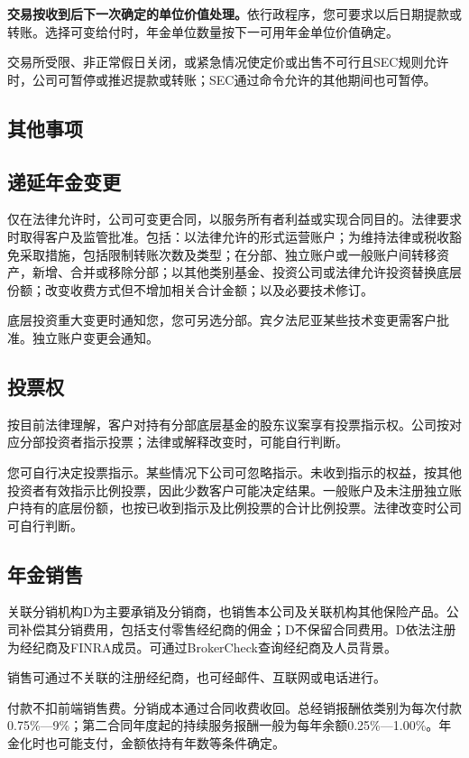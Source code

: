 \documentclass[UTF8,fontset=none,11pt,a4paper]{ctexart}
\begin{document}
\textbf{交易按收到后下一次确定的单位价值处理。}依行政程序，您可要求以后日期提款或转账。选择可变给付时，年金单位数量按下一可用年金单位价值确定。


交易所受限、非正常假日关闭，或紧急情况使定价或出售不可行且SEC规则允许时，公司可暂停或推迟提款或转账；SEC通过命令允许的其他期间也可暂停。


\subsection*{其他事项}
\subsection*{递延年金变更}
仅在法律允许时，公司可变更合同，以服务所有者利益或实现合同目的。法律要求时取得客户及监管批准。包括：以法律允许的形式运营账户；为维持法律或税收豁免采取措施，包括限制转账次数及类型；在分部、独立账户或一般账户间转移资产，新增、合并或移除分部；以其他类别基金、投资公司或法律允许投资替换底层份额；改变收费方式但不增加相关合计金额；以及必要技术修订。


底层投资重大变更时通知您，您可另选分部。宾夕法尼亚某些技术变更需客户批准。独立账户变更会通知。


\subsection*{投票权}
按目前法律理解，客户对持有分部底层基金的股东议案享有投票指示权。公司按对应分部投资者指示投票；法律或解释改变时，可能自行判断。


您可自行决定投票指示。某些情况下公司可忽略指示。未收到指示的权益，按其他投资者有效指示比例投票，因此少数客户可能决定结果。一般账户及未注册独立账户持有的底层份额，也按已收到指示及比例投票的合计比例投票。法律改变时公司可自行判断。


\subsection*{年金销售}
关联分销机构D为主要承销及分销商，也销售本公司及关联机构其他保险产品。公司补偿其分销费用，包括支付零售经纪商的佣金；D不保留合同费用。D依法注册为经纪商及FINRA成员。可通过BrokerCheck查询经纪商及人员背景。


销售可通过不关联的注册经纪商，也可经邮件、互联网或电话进行。


付款不扣前端销售费。分销成本通过合同收费收回。总经销报酬依类别为每次付款0.75\%—9\%；第二合同年度起的持续服务报酬一般为每年余额0.25\%—1.00\%。年金化时也可能支付，金额依持有年数等条件确定。
\end{document}
